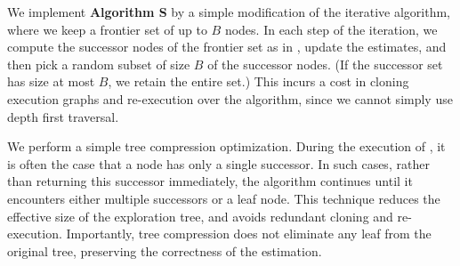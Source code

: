 We implement \textbf{Algorithm S} by a simple modification of the iterative \trust algorithm, where we keep 
a frontier set of up to $B$ nodes.
In each step of the iteration, we compute the successor nodes of the frontier set as in \trust, update the estimates,
and then pick a random subset of size $B$ of the successor nodes.
(If the successor set has size at most $B$, we retain the entire set.)
This incurs a cost in cloning execution graphs and re-execution over the \trust algorithm, since we cannot simply use depth first traversal.

We perform a simple tree compression optimization.
During the execution of \trust, it is often the case that a node has only a single successor.
In such cases, rather than returning this successor immediately,  
the algorithm continues until it encounters either multiple successors or a leaf node.
This technique reduces the effective size of the exploration tree, and avoids redundant cloning and re-execution.
Importantly, tree compression does not eliminate any leaf from the original tree, preserving the correctness of the estimation.
%


